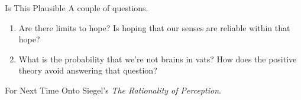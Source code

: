 \documentclass[
  17pt,
  letterpaper,
  ignorenonframetext,
  aspectratio=169,
  handout]{beamer}
\providecommand{\tightlist}{%
  \setlength{\itemsep}{0pt}\setlength{\parskip}{0pt}}\usepackage{longtable,booktabs,array}
\begin{document}
\begin{frame}{Is This Plausible}
\protect\hypertarget{is-this-plausible}{}
A couple of questions.

\begin{enumerate}[<+->]
\tightlist
\item
  Are there limits to hope? Is hoping that our senses are reliable
  within that hope?
\item
  What is the probability that we're not brains in vats? How does the
  positive theory avoid answering that question?
\end{enumerate}
\end{frame}

\begin{frame}{For Next Time}
\protect\hypertarget{for-next-time}{}
Onto Siegel's \emph{The Rationality of Perception}.
\end{frame}
\end{document}
